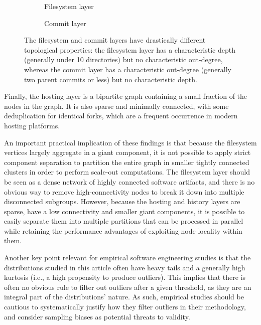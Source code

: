 \begin{figure}
    \begin{subfigure}{.55\textwidth}
        \centering
        
        \caption{Filesystem layer}%
        \label{fig:topology-summary-filesystem}
    \end{subfigure}\hfill%
    \begin{subfigure}{.40\textwidth}
        \centering
        
        \caption{Commit layer}%
        \label{fig:topology-summary-revision}
    \end{subfigure}
    \caption{The filesystem and commit layers have drastically different
    topological properties: the filesystem layer has a characteristic depth
    (generally under 10 directories) but no characteristic out-degree, whereas
    the commit layer has a characteristic out-degree (generally two parent
    commits or less) but no characteristic depth.}
    \label{fig:topology-summary}
\end{figure}

Finally, the hosting layer is a bipartite graph containing a small fraction of
the nodes in the graph. It is also sparse and minimally connected, with some
deduplication for identical forks, which are a frequent occurrence in modern
hosting platforms.

An important practical implication of these findings is that because the
filesystem vertices largely aggregate in a giant component, it is not possible
to apply strict component separation to partition the entire graph in smaller
tightly connected clusters in order to perform scale-out computations. The
filesystem layer should be seen as a dense network of highly connected software
artifacts, and there is no obvious way to remove high-connectivity nodes to
break it down into multiple disconnected subgroups.  However, because the
hosting and history layers are sparse, have a low connectivity and smaller
giant components, it is possible to easily separate them into multiple
partitions that can be processed in parallel while retaining the performance
advantages of exploiting node locality within them.

Another key point relevant for empirical software engineering studies is that
the distributions studied in this article often have heavy tails and a
generally high kurtosis (i.e., a high propensity to produce outliers). This
implies that there is often no obvious rule to filter out outliers after a
given threshold, as they are an integral part of the distributions' nature.  As
such, empirical studies should be cautious to systematically justify how they
filter outliers in their methodology, and consider sampling biases as potential
threats to validity.

